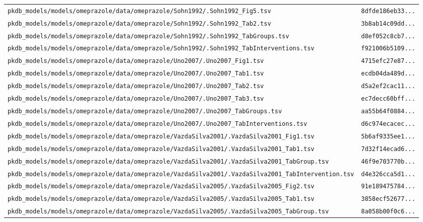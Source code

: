 \begin{longtable}{ll}
\texttt{pkdb\_models/models/omeprazole/data/omeprazole/Sohn1992/.Sohn1992\_Fig5.tsv} & \texttt{8dfde186eb33...} \\
\texttt{pkdb\_models/models/omeprazole/data/omeprazole/Sohn1992/.Sohn1992\_Tab2.tsv} & \texttt{3b8ab14c09dd...} \\
\texttt{pkdb\_models/models/omeprazole/data/omeprazole/Sohn1992/.Sohn1992\_TabGroups.tsv} & \texttt{d8ef052c8cb7...} \\
\texttt{pkdb\_models/models/omeprazole/data/omeprazole/Sohn1992/.Sohn1992\_TabInterventions.tsv} & \texttt{f921006b5109...} \\
\texttt{pkdb\_models/models/omeprazole/data/omeprazole/Uno2007/.Uno2007\_Fig1.tsv} & \texttt{4715efc27e87...} \\
\texttt{pkdb\_models/models/omeprazole/data/omeprazole/Uno2007/.Uno2007\_Tab1.tsv} & \texttt{ecdb04da489d...} \\
\texttt{pkdb\_models/models/omeprazole/data/omeprazole/Uno2007/.Uno2007\_Tab2.tsv} & \texttt{d5a2ef2cac11...} \\
\texttt{pkdb\_models/models/omeprazole/data/omeprazole/Uno2007/.Uno2007\_Tab3.tsv} & \texttt{ec7decc60bff...} \\
\texttt{pkdb\_models/models/omeprazole/data/omeprazole/Uno2007/.Uno2007\_TabGroups.tsv} & \texttt{aa55b64f0884...} \\
\texttt{pkdb\_models/models/omeprazole/data/omeprazole/Uno2007/.Uno2007\_TabInterventions.tsv} & \texttt{d6c974ecacec...} \\
\texttt{pkdb\_models/models/omeprazole/data/omeprazole/VazdaSilva2001/.VazdaSilva2001\_Fig1.tsv} & \texttt{5b6af9335ee1...} \\
\texttt{pkdb\_models/models/omeprazole/data/omeprazole/VazdaSilva2001/.VazdaSilva2001\_Tab1.tsv} & \texttt{7d32f14ecad6...} \\
\texttt{pkdb\_models/models/omeprazole/data/omeprazole/VazdaSilva2001/.VazdaSilva2001\_TabGroup.tsv} & \texttt{46f9e703770b...} \\
\texttt{pkdb\_models/models/omeprazole/data/omeprazole/VazdaSilva2001/.VazdaSilva2001\_TabIntervention.tsv} & \texttt{d4e326cca5d1...} \\
\texttt{pkdb\_models/models/omeprazole/data/omeprazole/VazdaSilva2005/.VazdaSilva2005\_Fig2.tsv} & \texttt{91e189475784...} \\
\texttt{pkdb\_models/models/omeprazole/data/omeprazole/VazdaSilva2005/.VazdaSilva2005\_Tab1.tsv} & \texttt{3858ecf52677...} \\
\texttt{pkdb\_models/models/omeprazole/data/omeprazole/VazdaSilva2005/.VazdaSilva2005\_TabGroup.tsv} & \texttt{8a058b00f0c6...} \\

\end{longtable}
